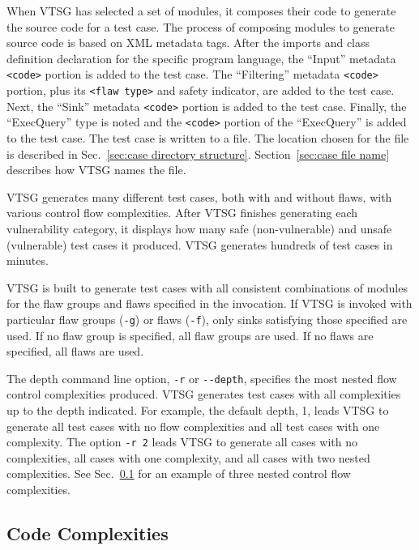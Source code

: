 \documentclass[12pt]{article}
\begin{document}
When VTSG has selected a set of modules, it composes
their code to generate the source code for a test case.
The process of composing modules to generate source code is
based on XML metadata tags.
After the imports and class definition declaration for the 
specific program
language, the ``Input'' metadata \verb|<code>| portion
is added to the test case.  
The ``Filtering'' metadata \verb|<code>| portion, plus its
\verb|<flaw type>| and safety indicator, are added to
the test case.  Next, the ``Sink'' metadata 
\verb|<code>| portion
is added to the test case.  Finally, the ``ExecQuery'' type is 
noted and the 
\verb|<code>| portion of the ``ExecQuery'' is added
to the 
test case.  The test case is written to a file.  
The location chosen for the file is
described in Sec.~\ref{sec:case directory structure}.
Section~\ref{sec:case file name} describes how VTSG names the file.

VTSG generates many different test cases, both with and without
flaws, with various control flow complexities.  After VTSG finishes
generating each vulnerability category, it displays how many safe (non-vulnerable)
and unsafe (vulnerable) test cases it produced.
VTSG generates hundreds of test cases in minutes.

VTSG is built to generate test cases with all consistent combinations
of modules for the flaw groups and flaws specified in the invocation.
If VTSG is invoked with particular flaw groups (\verb|-g|) or flaws (\verb|-f|),
only sinks satisfying those specified are used.
If no flaw group is specified, all flaw groups are used.  
If no flaws are specified, all flaws are used.

\label{sec:depth of complexities}
The depth command line option, \verb|-r| or \verb|--depth|, 
specifies the
most nested flow control complexities produced.
VTSG generates test cases with all complexities up to the depth
indicated.
For example, the default depth, 1, leads VTSG to generate all
test cases with no flow complexities and all test cases with 
one complexity.  The option \verb|-r 2| leads VTSG to generate
all cases with no complexities, all cases with one complexity, 
and all cases with two nested complexities.
See Sec.~\ref{sec:code complexities} for an example of three 
nested control flow complexities.

\subsection{Code Complexities}
\label{sec:code complexities}
\end{document}
